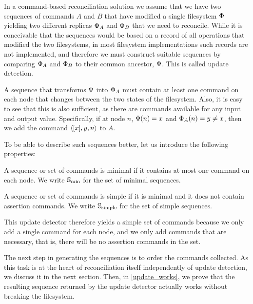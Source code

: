 
In a command-based reconciliation solution we assume that we have two sequences of commands
$A$ and $B$ that have modified a single filesystem $\Phi$ yielding two different replicas $\Phi_A$ and $\Phi_B$ that we
need to reconcile. While it is conceivable that the sequences would be based on a record of
all operations that modified the two filesystems, in most filesystem implementations
such records are not implemented, and therefore we must construct suitable sequences
by comparing $\Phi_A$ and $\Phi_B$ to their common ancestor, $\Phi$. This is called update detection.

A sequence that transforms $\Phi$ into $\Phi_A$ must contain at least one command on each node
that changes between the two states of the filesystem. Also, it is easy to see that this is also
sufficient, as there are commands available for any input and output value. 
Specifically, if at node $n$, $\Phi(n)=x$ and $\Phi_A(n)=y\neq x$, then we add the command $\langle{[x],y,n}\rangle$ to $A$.

To be able to describe such sequences better, let us introduce the following properties:


\begin{mydef}
A sequence or set of commands is minimal if it contains at most one command on each node.
We write $\mathbb{S}_{\mathrm{min}}$ for the set of minimal sequences.
\end{mydef}

\begin{mydef}
A sequence or set of commands is simple if it is minimal and it does not contain assertion commands.
We write $\mathbb{S}_{\mathrm{simple}}$ for the set of simple sequences.
\end{mydef}

This update detector therefore yields a simple set of commands because we only add a single command
for each node, and we only add commands that are necessary, that is, there will be no 
assertion commands in the set.

The next step in generating the sequences is to order the commands collected.
As this task is at the heart of reconciliation itself independently of update detection,
we discuss it in the next section.
Then, in \cref{update_works}, we prove that the resulting sequence 
returned by the update detector actually works without breaking the filesystem.
